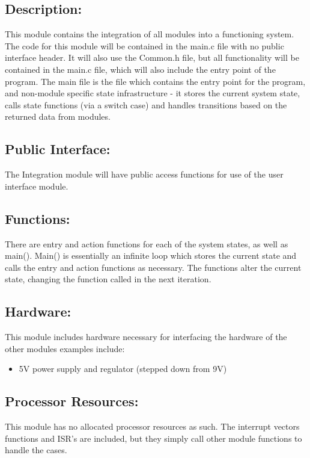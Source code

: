 \documentclass[]{article}
\begin{document}
\subsection{Description:}
This module contains the integration of all modules into a functioning system. The code for this module will be contained in the main.c file with no public interface header. It will also use the Common.h file, but all functionality will be contained in the main.c file, which will also include the entry point of the program.
The main file is the file which contains the entry point for the program, and non-module specific state infrastructure - it stores the current system state, calls state functions (via a switch case) and handles transitions based on the returned data from modules.

\subsection{Public Interface:}
The Integration module will have public access functions for use of the user interface module.

\subsection{Functions:}
There are entry and action functions for each of the system states, as well as main(). Main() is essentially an infinite loop which stores the current state and calls the entry and action functions as necessary. The functions alter the current state, changing the function called in the next iteration.

\subsection{Hardware:}
This module includes hardware necessary for interfacing the hardware of the other modules examples include:
\begin{itemize}
	\item 5V power supply and regulator (stepped down from 9V)
\end{itemize}

\subsection{Processor Resources:}
This module has no allocated processor resources as such. The interrupt vectors functions and ISR's are included, but they simply call other module functions to handle the cases.
\end{document}

